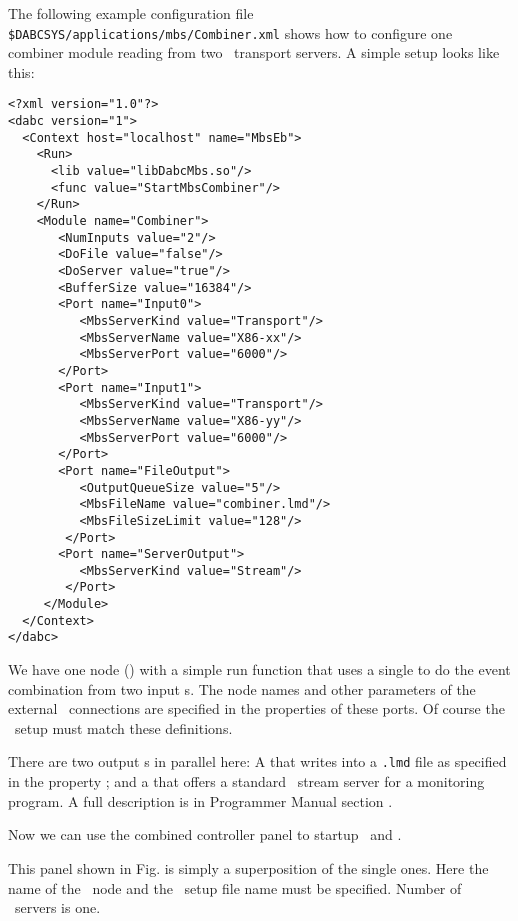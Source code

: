 The following example configuration file {\tt \$DABCSYS/applications/mbs/Combiner.xml} shows how to 
configure one combiner module reading from two \mbs\ transport servers.
A simple setup looks like this:

\begin{small}
\begin{verbatim}
<?xml version="1.0"?>
<dabc version="1">
  <Context host="localhost" name="MbsEb">
    <Run>
      <lib value="libDabcMbs.so"/>
      <func value="StartMbsCombiner"/>
    </Run>
    <Module name="Combiner">
       <NumInputs value="2"/>
       <DoFile value="false"/>
       <DoServer value="true"/>
       <BufferSize value="16384"/>
       <Port name="Input0">
          <MbsServerKind value="Transport"/>
          <MbsServerName value="X86-xx"/>
          <MbsServerPort value="6000"/>
       </Port>
       <Port name="Input1">
          <MbsServerKind value="Transport"/>
          <MbsServerName value="X86-yy"/>
          <MbsServerPort value="6000"/>
       </Port>
       <Port name="FileOutput">
          <OutputQueueSize value="5"/>
          <MbsFileName value="combiner.lmd"/>
          <MbsFileSizeLimit value="128"/>
        </Port>
       <Port name="ServerOutput">
          <MbsServerKind value="Stream"/>
        </Port>
     </Module>
  </Context>
</dabc>
\end{verbatim}
\end{small}

We have one node () with a simple run function 
 that uses a single  to do the
event combination from two input s.
The node names and other parameters of the external \mbs\ connections
are specified in the  properties of these ports.
Of course the \mbs\ setup must match these definitions. 

There are two output s in parallel here: A 
that writes into a {\tt *.lmd} file as specified in the property 
; and a  that offers a standard \mbs\ stream server
for a monitoring program.
A full description is in Programmer Manual section
.

Now we can use the combined  controller panel to startup \mbs\ and \dabc.

This panel shown in Fig.  is simply a superposition of the single ones.
Here the   name of the \dabc\ node and
the \dabc\ setup file name must be specified. Number of \dabc\ servers is one.

